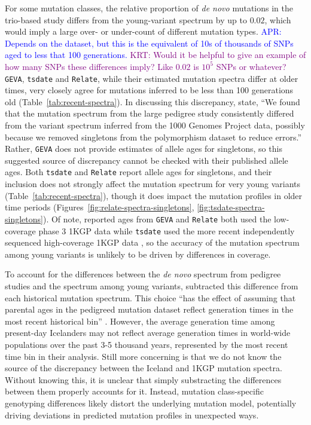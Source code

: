 \documentclass[]{article}
\newcommand{\aprcomment}[1]{{\textcolor{blue}{APR: #1}}}
\newcommand{\krtcomment}[1]{{\textcolor{purple}{KRT: #1}}}
\newcommand{\GEVA}{\texttt{GEVA}\xspace}
\newcommand{\tsdate}{\texttt{tsdate}\xspace}
\newcommand{\relate}{\texttt{Relate}\xspace}
\begin{document}
For some mutation classes, the relative proportion of \emph{de novo} mutations
in the trio-based study differs from the young-variant spectrum by up to
$0.02$, which would imply a large over- or under-count of different mutation
types. \aprcomment{Depends on the dataset, but this is the equivalent of 10s of
thousands of SNPs aged to less that 100 generations.}
\krtcomment{Would it be helpful to give an example of how many SNPs these
differences imply? Like $0.02$ is $10^5$ SNPs or whatever?}
\GEVA, \tsdate and \relate, while their estimated mutation spectra
differ at older times, very closely agree for mutations inferred to be less
than 100 generations old (Table~\ref{tab:recent-spectra}). In discussing this
discrepancy, \citet{wang2023human} state, ``We found that the mutation spectrum
from the large pedigree study consistently differed from the variant spectrum
inferred from the 1000 Genomes Project data, possibly because we removed
singletons from the polymorphism dataset to reduce errors.'' Rather, \GEVA does
not provide estimates of allele ages for singletons, so this suggested source
of discrepancy cannot be checked with their published allele ages. Both \tsdate
and \relate report allele ages for singletons, and their inclusion does not
strongly affect the mutation spectrum for very young variants
(Table~\ref{tab:recent-spectra}), though it does impact the mutation profiles
in older time periods (Figures~\ref{fig:relate-spectra-singletons},
\ref{fig:tsdate-spectra-singletons}). Of note, reported ages from \GEVA and
\relate both used the low-coverage phase 3 1KGP data while \tsdate used the
more recent independently sequenced high-coverage 1KGP data
\citep{byrska2022high}, so the accuracy of the mutation spectrum among young
variants is unlikely to be driven by differences in coverage.

To account for the differences between the \emph{de novo} spectrum from
pedigree studies \citep{jonsson2017parental} and the spectrum among young
variants, \citet{wang2023human} subtracted this difference from each historical
mutation spectrum. This choice ``has the effect of assuming that parental ages
in the pedigreed mutation dataset reflect generation times in the most recent
historical bin'' \citep{wang2023human}. However, the average generation time
among present-day Icelanders may not reflect average generation times in
world-wide populations over the past 3-5 thousand years, represented by the
most recent time bin in their analysis. Still more concerning is that we do not
know the source of the discrepancy between the Iceland and 1KGP mutation
spectra. Without knowing this, it is unclear that simply substracting the
differences between them properly accounts for it. Instead, mutation
class-specific genotyping differences likely distort the underlying mutation
model, potentially driving deviations in predicted mutation profiles in
unexpected ways.
\end{document}
